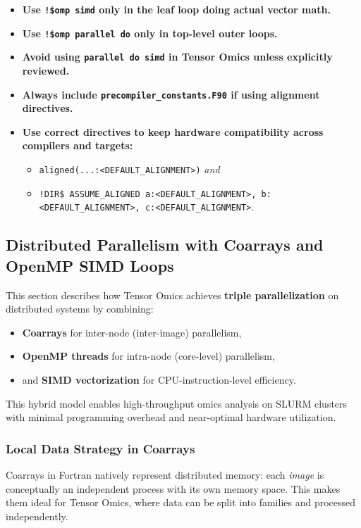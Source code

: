 \documentclass{article}
\begin{document}
\begin{itemize}
\item \textbf{Use \texttt{!\$omp simd} only in the leaf loop doing actual vector math.}
\item \textbf{Use \texttt{!\$omp parallel do} only in top-level outer loops.}
\item \textbf{Avoid using \texttt{parallel do simd} in Tensor Omics unless explicitly reviewed.}
\item \textbf{Always include \texttt{precompiler\_constants.F90} if using alignment directives.}
\item \textbf{Use correct directives to keep hardware compatibility across
  compilers and targets:}
  \begin{itemize}
    \item \texttt{aligned(...:<DEFAULT\_ALIGNMENT>)} \emph{and}
    \item \texttt{!DIR\$ ASSUME\_ALIGNED a:<DEFAULT\_ALIGNMENT>,
      b:<DEFAULT\_ALIGNMENT>, c:<DEFAULT\_ALIGNMENT>}.
  \end{itemize}
\end{itemize}

\subsection{Distributed Parallelism with Coarrays and OpenMP SIMD Loops}

This section describes how Tensor Omics achieves \textbf{triple parallelization} on distributed systems by combining:

\begin{itemize}
  \item \textbf{Coarrays} for inter-node (inter-image) parallelism,
  \item \textbf{OpenMP threads} for intra-node (core-level) parallelism,
  \item and \textbf{SIMD vectorization} for CPU-instruction-level efficiency.
\end{itemize}

This hybrid model enables high-throughput omics analysis on SLURM clusters with minimal programming overhead and near-optimal hardware utilization.

\subsubsection{Local Data Strategy in Coarrays}
Coarrays in Fortran natively represent distributed memory: each \emph{image} is conceptually an independent process with its own memory space. This makes them ideal for Tensor Omics, where data can be split into families and processed independently. 
\end{document}
